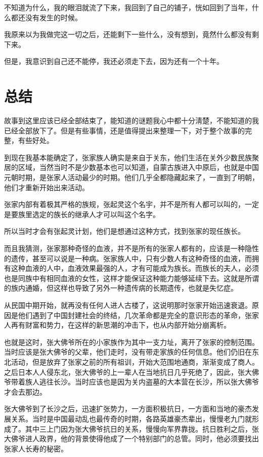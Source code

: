不知道为什么，我的眼泪就流了下来，我回到了自己的铺子，恍如回到了当年，什么都还没有发生的时候。

我原来以为我做完这一切之后，还能剩下一些什么，没有想到，竟然什么都没有剩下来。

但是，我意识到自己还不能停，我还必须走下去，因为还有一个十年。

\chapter{总结}

故事到这里应该已经全部结束了，能知道的谜题我心中都十分淸楚，不能知道的我已经全部放下了。但是有些事情，还是值得提出来整理一下，对于整个故事的完整，有些好处。

到现在我基本能确定了，张家族人确实是来自于关东，他们生活在关外少数民族聚居的区域，当然当时不是少数基本也可以知道，自蒙古族进入中原后，也就是中国元朝时期，是张家人活动最少的时期。他们几乎全都隐藏起来了，一直到了明朝，他们才重新开始出来活动。

张家内部有着极其严格的族规，张起灵这个名宇，并不是所有人都可以叫的，一定是要族里选定的族长的继承人才可以叫这个名字。

所以当时才会有张起灵计划，他们是想通过这种方式，找到张家的现任族长。

而且我猜测，张家那种奇怪的血液，并不是所有的张家人都有的，应该是一种隐性的遗传，甚至可以说是一种病。张家族人中，只有少数人有这种奇怪的血液，而拥有这种血液的人中，血液效果最强的人，才有可能成为族长。而族长的夫人，必须也是同族中有相同血液的女性，这样才能保证这种能力能够延续下去。这就是所谓的族内通婚，但这样也导致了另外一种遗传病的长期遗传，也就是失忆症。

从民国中期开始，就再没有任何人进人古楼了，这说明那时张家开始迅速衰退。原因是他们遇到了中国封建社会的终结，几次革命都是完全的意识形态的革命，张家人再有财富和势力，在这样的新思潮的冲击下，也从内部开始分崩离析。

也就是这时，张大佛爷所在的小家族作为其中一支力址，离开了张家的控制范围。当时应该是张大佛爷的父辈，他们走时，没有带走家族的任何信息。他们仍旧在东北活动，但是放弃了张家之前的所有祖训，开始大范围地通商，渐渐变成了商人。之后日本人人侵东北，张大佛爷的上一辈人在当地抗日几乎死绝了，因此，张大佛爷带着族人逃往长沙。当时应该也是因为关内盗墓的大本营在长沙，所以张大佛爷才会去那边。

张大佛爷到了长沙之后，迅速扩张势力，一方面积极抗日，一方面和当地的豪杰发展关系。当时是中国最动乱也最传奇的时期，各路英雄豪杰辈出，慢慢老九门就形成了。其中三上门因为张大佛爷抗日的关系，慢慢向军界靠拢。抗日胜利之后，张大佛爷进人政界，他的背景使得他成了一个特别部门的总管。同时，他必须要找出张家人长寿的秘密。

